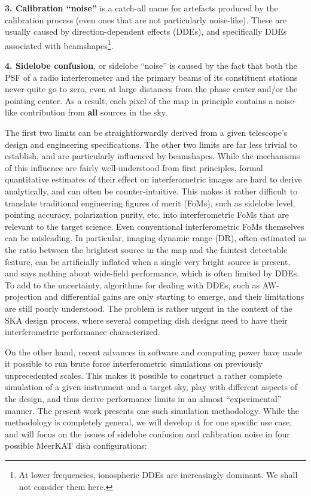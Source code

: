 \documentclass{aa}
\begin{document}
{\bf 3. Calibration ``noise''} is a catch-all name for artefacts produced by the calibration process (even ones that are not particularly noise-like). These are usually caused by direction-dependent effects (DDEs), and specifically DDEs associated with beamshapes\footnote{At lower frequencies, ionospheric DDEs are increasingly dominant. We shall not consider them here.}.

{\bf 4. Sidelobe confusion}, or sidelobe ``noise'' is caused by the fact that both the PSF of a radio interferometer and the primary beams of its constituent stations never quite go to zero, even at large distances from 
the phase center and/or the pointing center. As a result, each pixel of the map in principle contains a noise-like contribution from {\bf all} sources in the sky.

The first two limits can be straightforwardly derived from a given telescope's design and engineering specifications. The other two limits are far less trivial to establish, and are particularly influenced by beamshapes. While the mechanisms of this influence are fairly well-understood from first principles, formal quantitative estimates of their effect on interferometric images are hard to derive analytically, and can often be counter-intuitive. This makes it rather difficult to translate traditional engineering figures of merit (FoMs), such as sidelobe level, pointing accuracy, polarization purity, etc. into interferometric FoMs that are relevant to the target science. Even conventional interferometric FoMs themselves can be misleading. In particular, imaging dynamic range (DR), often estimated as the ratio between the brightest source in the map and the faintest detectable feature, can be artificially inflated when a single very bright source is present, and says nothing about wide-field  performance, 
which is often limited by DDEs. To add to the uncertainty, algorithms for dealing with DDEs, such as AW-projection \citep{SB:imageplane} and differential gains \citep{RRIME3} are only starting to emerge, and their limitations are still poorly understood. The problem is rather urgent in the context of the SKA design process, where several competing dish designs need to have their interferometric performance characterized.

On the other hand, recent advances in software and computing power have made it possible to run brute force interferometric simulations on previously unprecedented scales. This makes it possible to construct a rather complete simulation of a given instrument and a target sky, play with different aspects of the design, and thus derive performance limits in an almost ``experimental'' manner. The present work presents one such simulation methodology. While the methodology is completely general, we will develop it for one specific use case, and will focus on the issues of sidelobe confusion and calibration noise in four possible MeerKAT dish configurations:
\end{document}
